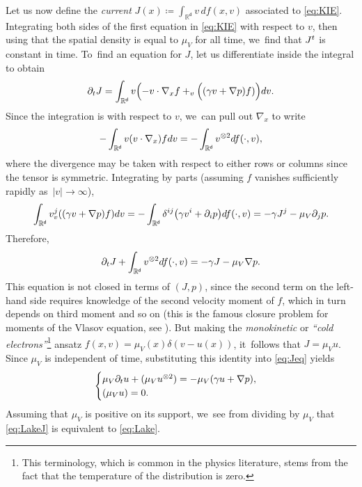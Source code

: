 \documentclass[JEP,XML,SOM,Unicode,published]{cedram}
\theoremstyle{plain}
\theoremstyle{definition}
\DeclarePairedDelimiter{\pa}{\lparen}{\rparen}
\let\div\relax
\DeclareMathOperator{\div}{\mathrm{div}}
\newcommand{\R}{{\mathbb{R}}}
\let\ga\gamma
\let\nab\nabla
\let\p\partial
\renewcommand{\d}{\mathsf{d}}
\begin{document}
Let us now define the \emph{current} $J(x)\coloneqq \int_{\R^\d}v\, df(x,v)$ associated to \eqref{eq:KIE}. Integrating both sides of the first equation in \eqref{eq:KIE} with respect to {$v$}, then using that the spatial density is equal to $\mu_V$ for all time, we~find that {$\div J^t$ is constant in time}. To~find an equation for $J$, let us differentiate inside the integral to obtain
\begin{equation*}
\p_t J = \int_{\R^\d}v\pa*{-v\cdot\nabla_x f + \div_v\Big((\ga v + \nab p) f)}dv.
\end{equation*}
Since the integration is with respect to $v$, we~can pull out $\nabla_x$ to write
\begin{equation*}
-\int_{\R^\d}v (v\cdot\nabla_x)fdv = -\div\int_{\R^\d}v^{\otimes 2}df(\cdot,v),
\end{equation*}
where the divergence may be taken with respect to either rows or columns since the tensor is symmetric. Integrating by parts (assuming $f$ vanishes sufficiently rapidly as~$|v|\to\infty$),
\begin{equation*}
\int_{\R^\d}v^j\div_v\pa*{(\ga v +\nabla p)f}dv = -\int_{\R^\d}\delta^{ij}\pa*{\ga v^i+\p_{i}p}df(\cdot,v) = -\ga J^j -\mu_V\p_{j}p.
\end{equation*}
Therefore,
\begin{equation}\label{eq:Jeq}
\p_t J + \div\int_{\R^\d}v^{\otimes 2}df(\cdot,v) = -\ga J -\mu_V\nabla p.
\end{equation}
This equation is not closed in terms of $(J,p)$, since the second term on the left-hand side requires knowledge of the second velocity moment of $f$, {which in turn depends on third moment and so on} (this is the famous closure problem for moments of the Vlasov equation, \eg see \cite{Uhlemann2018}). But making the \emph{monokinetic} or \emph{``cold electrons''}\footnote{This terminology, which is common in the physics literature, stems from the fact that the temperature of the distribution is zero.} ansatz $f(x,v)=\mu_V(x)\delta(v-u(x))$, it~follows that $J=\mu_V u$. Since $\mu_V$ is independent of time, substituting this identity into \eqref{eq:Jeq} yields
\begin{equation}\label{eq:LakeJ}
\begin{cases}
\mu_V\p_t u +\div(\mu_V u^{\otimes 2}) = -\mu_V\pa*{\ga u+\nabla p},\\
\div(\mu_V u) = 0.
\end{cases}
\end{equation}
Assuming that $\mu_V$ is positive on its support, we~see from dividing by $\mu_V$ that \eqref{eq:LakeJ} is equivalent to \smallskip \eqref{eq:Lake}.
\end{document}
